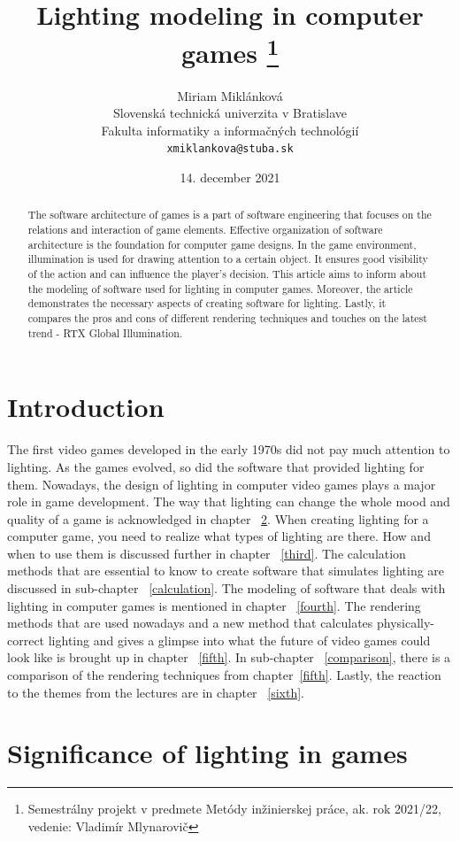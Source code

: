 \documentclass[10pt,twoside,english,a4paper]{article}
\title{Lighting modeling in computer games
\thanks{Semestrálny projekt v predmete Metódy inžinierskej práce, ak. rok 2021/22, vedenie: Vladimír Mlynarovič}}
\author{Miriam Miklánková\\[2pt]
	{\small Slovenská technická univerzita v Bratislave}\\
	{\small Fakulta informatiky a informačných technológií}\\
	{\small \texttt{xmiklankova@stuba.sk}}
	}
\date{\small 14. december 2021}
\begin{document}
\maketitle

\begin{abstract}
The software architecture of games is a part of software engineering that focuses on the relations and interaction of game elements. Effective organization of software architecture is the foundation for computer game designs. In the game environment, illumination is used for drawing attention to a certain object. It ensures good visibility of the action and can influence the player's decision. This article aims to inform about the modeling of software used for lighting in computer games. Moreover, the article demonstrates the necessary aspects of creating software for lighting. Lastly, it compares the pros and cons of different rendering techniques and touches on the latest trend - RTX Global Illumination.
\end{abstract}


\section{Introduction}
The first video games developed in the early 1970s did not pay much attention to lighting. As the games evolved, so did the software that provided lighting for them. Nowadays, the design of lighting in computer video games plays a major role in game development. The way that lighting can change the whole mood and quality of a game is acknowledged in chapter ~\ref{second}. When creating lighting for a computer game, you need to realize what types of lighting are there. How and when to use them is discussed further in chapter ~\ref{third}. The calculation methods that are essential to know to create software that simulates lighting are discussed in sub-chapter ~\ref{calculation}. The modeling of software that deals with lighting in computer games is mentioned in chapter ~\ref{fourth}. The rendering methods that are used nowadays and a new method that calculates physically-correct lighting and gives a glimpse into what the future of video games could look like \cite{Foundry-Article} is brought up in chapter ~\ref{fifth}. In sub-chapter ~\ref{comparison}, there is a comparison of the rendering techniques from chapter~\ref{fifth}. Lastly, the reaction to the themes from the lectures are in chapter ~\ref{sixth}.  


\section{Significance of lighting in games} \label{second}
\end{document}
